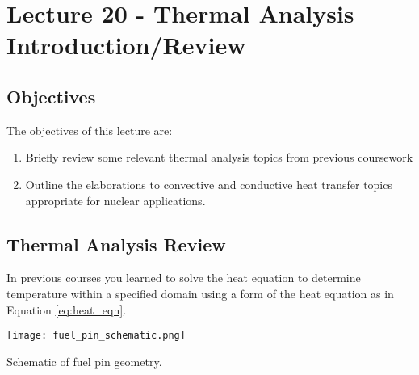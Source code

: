 \chapter{Lecture 20 - Thermal Analysis Introduction/Review}
\label{ch:ch20}
\section{Objectives}
The objectives of this lecture are:
\begin{enumerate}
\item Briefly review some relevant thermal analysis topics from previous coursework
\item Outline the elaborations to convective and conductive heat transfer topics appropriate for nuclear applications.
\end{enumerate}

\section{Thermal Analysis Review}
In previous courses you learned to solve the heat equation to determine temperature within a specified domain using a form of the heat equation as in Equation \ref{eq:heat_eqn}.

\begin{marginfigure}
\texttt{[image: fuel\_pin\_schematic.png]}
\caption{Schematic of fuel pin geometry.}
\label{fig:fuel_pin_schematic}
\end{marginfigure}

